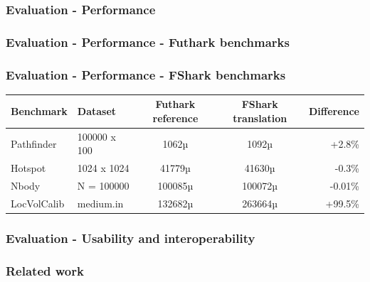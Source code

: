 \documentclass[10pt, compress, usenames, dvipsnames]{beamer}
\begin{document}
\begin{frame}[fragile]
  \frametitle{Evaluation - Performance}




\end{frame}
\begin{frame}[fragile]
  \frametitle{Evaluation - Performance - Futhark benchmarks}
  
\end{frame}

\begin{frame}[fragile,c]
  \frametitle{Evaluation - Performance - FShark benchmarks}
  \begin{center}
  {\scriptsize
  \begin{tabular}{| l | l | c | c | r |}
    \hline			
    \textbf{Benchmark} & \textbf{Dataset} & \textbf{Futhark reference} & \textbf{FShark translation} & \textbf{Difference} \\
    \hline  
    Pathfinder & 100000 x 100 & 1062µ & 1092µ & +2.8\% \\
    \hline  
    Hotspot & 1024 x 1024 & 41779µ & 41630µ & -0.3\% \\
    \hline  
    Nbody & N = 100000 & 100085µ & 100072µ & -0.01\% \\
    \hline  
    LocVolCalib & medium.in & 132682µ & 263664µ & +99.5\% \\
    \hline  
  \end{tabular}
  }
    \end{center}
\end{frame}

\begin{frame}[fragile]
  \frametitle{Evaluation - Usability and interoperability}

  
\end{frame}

\begin{frame}[fragile]
  \frametitle{Related work}
\end{frame}

\end{document}
